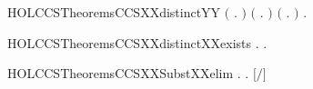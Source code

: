 \begin{SaveVerbatim}{HOLCCSTheoremsCCSXXdistinctYY}
   \ensuremath{(}\HOLSymConst{\HOLTokenForall{}}   .    \HOLSymConst{\HOLTokenNotEqual{}}  \HOLSymConst{\ensuremath{\mid}} \ensuremath{)} \HOLSymConst{\HOLTokenConj{}}
   \ensuremath{(}\HOLSymConst{\HOLTokenForall{}}   .    \HOLSymConst{\HOLTokenNotEqual{}}   \ensuremath{)} \HOLSymConst{\HOLTokenConj{}}
   \ensuremath{(}\HOLSymConst{\HOLTokenForall{}}   .    \HOLSymConst{\HOLTokenNotEqual{}}   \ensuremath{)} \HOLSymConst{\HOLTokenConj{}}
   \HOLSymConst{\HOLTokenForall{}}   .    \HOLSymConst{\HOLTokenNotEqual{}}   
\end{SaveVerbatim}
\newcommand{\HOLCCSTheoremsCCSXXdistinctYY}{\UseVerbatim{HOLCCSTheoremsCCSXXdistinctYY}}
\begin{SaveVerbatim}{HOLCCSTheoremsCCSXXdistinctXXexists}
\HOLTokenTurnstile{} \HOLSymConst{\HOLTokenForall{}}. \HOLSymConst{\HOLTokenExists{}}.  \HOLSymConst{\HOLTokenNotEqual{}} 
\end{SaveVerbatim}
\newcommand{\HOLCCSTheoremsCCSXXdistinctXXexists}{\UseVerbatim{HOLCCSTheoremsCCSXXdistinctXXexists}}
\begin{SaveVerbatim}{HOLCCSTheoremsCCSXXSubstXXelim}
\HOLTokenTurnstile{} \HOLSymConst{\HOLTokenForall{}} .  \HOLConst{\HOLTokenNotIn{}}   \HOLSymConst{\HOLTokenEquiv{}} \HOLSymConst{\HOLTokenForall{}}. \ensuremath{[}\ensuremath{/}\ensuremath{]}  \HOLSymConst{\ensuremath{=}} 
\end{SaveVerbatim}
